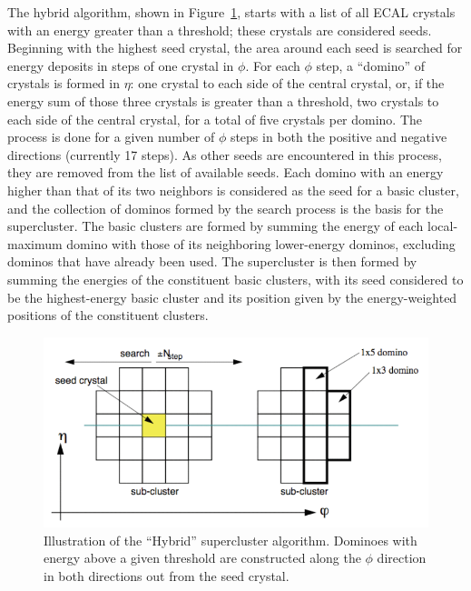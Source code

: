 The hybrid algorithm, 
shown in Figure~\ref{fig:HybridSuperCluster}, 
starts with a list of all 
ECAL crystals with an energy greater than a threshold; 
these crystals are considered seeds.  
Beginning with the highest seed crystal, 
the area around each seed is searched for 
energy deposits in steps of one crystal in $\phi$.
For each $\phi$ step, a ``domino'' of crystals is 
formed in $\eta$: 
one crystal to each side of the central crystal, 
or, if the energy sum of those three crystals is 
greater than a threshold, 
two crystals to each side of the central crystal, 
for a total of five crystals per domino.  
The process is done for a given number of $\phi$ 
steps in both the positive and negative directions 
(currently 17 steps).  
As other seeds are encountered in this process, 
they are removed from the list of available seeds.  
Each domino with an  energy higher than that of its two neighbors 
is considered as the seed for a basic cluster, 
and the collection of dominos formed by the search 
process is the basis for the supercluster.  
The basic clusters are formed by summing the 
energy of each local-maximum domino with 
those of its neighboring lower-energy dominos, 
excluding dominos that have already been used.  
The supercluster is then formed by summing the energies 
of the constituent basic clusters, 
with its seed considered to be the highest-energy 
basic cluster 
and its position given by the energy-weighted positions 
of the constituent clusters.  

 \begin{figure}[htb]
  \begin{center}
    \includegraphics[width=360pt]{Figures/elec-SC-hybrid-algo.png}
  \end{center}
  \caption[\fixspacing Illustration of the ``Hybrid'' supercluster algorithm]
	  {\fixspacing Illustration of the ``Hybrid'' supercluster algorithm. 
	    Dominoes with energy above a given threshold are constructed 
	    along the $\phi$ direction in both directions out from the seed crystal.  
	  }
  \label{fig:HybridSuperCluster}
 \end{figure}



